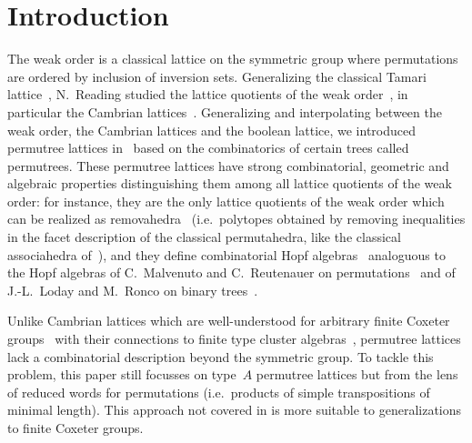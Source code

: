 \documentclass[11pt]{article}
\theoremstyle{definition}
\providecommand{\ie}{i.e.\ }
\numberwithin{equation}{section}
\begin{document}
\section{Introduction}

The weak order is a classical lattice on the symmetric group where permutations are ordered by inclusion of inversion sets.
Generalizing the classical Tamari lattice~\cite{Tamari}, N.~Reading studied the lattice quotients of the weak order~\cite{Reading-latticeCongruences}, in particular the Cambrian lattices~\cite{Reading-cambrianLattices,Reading-coxeterSortable}.
Generalizing and interpolating between the weak order, the Cambrian lattices and the boolean lattice, we introduced permutree lattices in~\cite{PilaudPons-permutrees} based on the combinatorics of certain trees called permutrees.
These permutree lattices have strong combinatorial, geometric and algebraic properties distinguishing them among all lattice quotients of the weak order: for instance, they are the only lattice quotients of the weak order which can be realized as removahedra~\cite{AlbertinPilaudRitter-Removahedra} (\ie polytopes obtained by removing inequalities in the facet description of the classical permutahedra, like the classical associahedra of~\cite{Loday,HohlwegLange}), and they define combinatorial Hopf algebras~\cite{PilaudPons-permutrees} analoguous to the Hopf algebras of C.~Malvenuto and C.~Reutenauer on permutations~\cite{MalvenutoReutenauer} and of J.-L.~Loday and M.~Ronco on binary trees~\cite{LodayRonco}.



Unlike Cambrian lattices which are well-understood for arbitrary finite Coxeter groups~\cite{Reading-cambrianLattices,Reading-coxeterSortable} with their connections to finite type cluster algebras~\cite{FominZelevinsky-ClusterAlgebrasI,FominZelevinsky-ClusterAlgebrasII}, permutree lattices lack a combinatorial description beyond the symmetric group.
To tackle this problem, this paper still focusses on type~$A$ permutree lattices but from the lens of reduced words for permutations (\ie products of simple transpositions of minimal length).
This approach not covered in \cite{PilaudPons-permutrees} is more suitable to generalizations to finite Coxeter groups.
\end{document}
